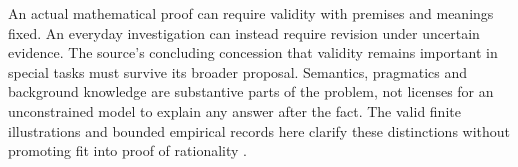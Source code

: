 An actual mathematical proof can require validity with premises and
meanings fixed. An everyday investigation can instead require revision
under uncertain evidence. The source's concluding concession that
validity remains important in special tasks must survive its broader
proposal. Semantics, pragmatics and background knowledge are substantive
parts of the problem, not licenses for an unconstrained model to explain
any answer after the fact. The valid finite illustrations and bounded
empirical records here clarify these distinctions without promoting
fit into proof of rationality
\cite[p.~292]{ChaterOaksford2021BayesianReasoning}.
